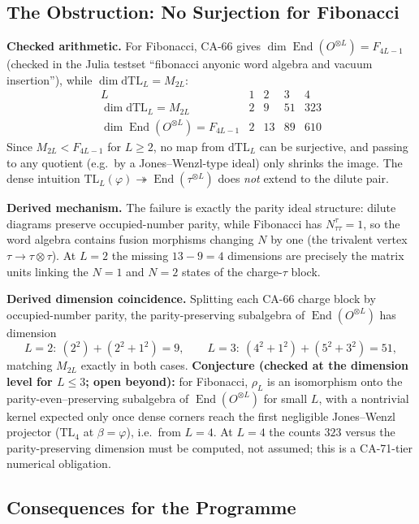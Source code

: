 \subsection{The Obstruction: No Surjection for Fibonacci}

\textbf{Checked arithmetic.}  For Fibonacci, CA-66 gives
\(\dim\operatorname{End}(O^{\otimes L})=F_{4L-1}\) (checked in the Julia
testset ``fibonacci anyonic word algebra and vacuum insertion''), while
\(\dim\mathrm{dTL}_L=M_{2L}\):
\[
\begin{array}{c|cccc}
L & 1 & 2 & 3 & 4\\\hline
\dim\mathrm{dTL}_L=M_{2L} & 2 & 9 & 51 & 323\\
\dim\operatorname{End}(O^{\otimes L})=F_{4L-1} & 2 & 13 & 89 & 610
\end{array}
\]
Since \(M_{2L}<F_{4L-1}\) for \(L\ge2\), no map from \(\mathrm{dTL}_L\) can be
surjective, and passing to any quotient (e.g.\ by a Jones--Wenzl-type ideal)
only shrinks the image.  The dense intuition
\(\mathrm{TL}_L(\varphi)\twoheadrightarrow\operatorname{End}(\tau^{\otimes L})\)
does \emph{not} extend to the dilute pair.

\textbf{Derived mechanism.}  The failure is exactly the parity ideal
structure: dilute diagrams preserve occupied-number parity, while Fibonacci
has \(N_{\tau\tau}^{\tau}=1\), so the word algebra contains fusion morphisms
changing \(N\) by one (the trivalent vertex \(\tau\to\tau\otimes\tau\)).  At
\(L=2\) the missing \(13-9=4\) dimensions are precisely the matrix units
linking the \(N=1\) and \(N=2\) states of the charge-\(\tau\) block.

\textbf{Derived dimension coincidence.}  Splitting each CA-66 charge block by
occupied-number parity, the parity-preserving subalgebra of
\(\operatorname{End}(O^{\otimes L})\) has dimension
\[
  L=2:\ (2^2)+(2^2+1^2)=9,
  \qquad
  L=3:\ (4^2+1^2)+(5^2+3^2)=51,
\]
matching \(M_{2L}\) exactly in both cases.  \textbf{Conjecture (checked at
the dimension level for \(L\le3\); open beyond):} for Fibonacci,
\(\rho_L\) is an isomorphism onto the parity-even--preserving subalgebra of
\(\operatorname{End}(O^{\otimes L})\) for small \(L\), with a nontrivial
kernel expected only once dense corners reach the first negligible
Jones--Wenzl projector (\(\mathrm{TL}_4\) at \(\beta=\varphi\)), i.e.\ from
\(L=4\).  At \(L=4\) the counts \(323\) versus the parity-preserving dimension
must be computed, not assumed; this is a CA-71-tier numerical obligation.

\subsection{Consequences for the Programme}

